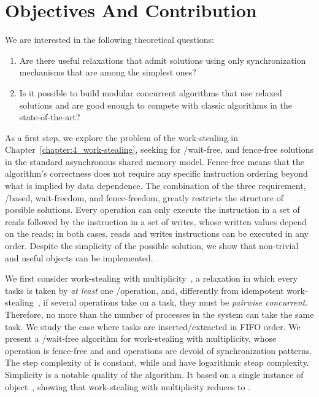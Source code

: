 \section{\label{section:Objectives}Objectives And Contribution}

We are interested in the following theoretical questions:

\begin{enumerate}
  \item Are there useful relaxations that admit solutions using only synchronization mechanisms that are among the simplest ones?
  \item Is it possible to build modular concurrent algorithms that use relaxed solutions and are good enough to compete with classic algorithms in the state-of-the-art?
\end{enumerate}

As a first step, we explore the problem of the work-stealing in Chapter~\ref{chapter:4_work-stealing}, seeking for \R/\W wait-free, and fence-free solutions in the standard asynchronous shared memory model. Fence-free means that the algorithm's correctness does not require any specific instruction ordering beyond what is implied by data dependence. The combination of the three requirement, \R/\W based, wait-freedom, and fence-freedom, greatly restricts the structure of possible solutions. Every operation can only execute the \R instruction in a set of reads followed by the \W instruction in a set of writes, whose written values depend on the reads; in both cases, reads and writes instructions can be executed in any order. Despite the simplicity of the possible solution, we show that non-trivial and useful objects can be implemented.

We first consider work-stealing with multiplicity~\cite{DBLP_journals_dc_CastanedaRR23}, a relaxation in which every tasks is taken by \textit{at least} one \Take/\Steal operation, and, differently from idempotent work-stealing~\cite{maged.vechev.2009}, if several operations take on a task, they must be \textit{pairwise concurrent}. Therefore, no more than the number of processes in the system can take the same task. We study the case where tasks are inserted/extracted in FIFO order. We present a \R/\W wait-free algorithm for work-stealing with multiplicity, whose \Put operation is fence-free and \Take and \Steal operations are devoid of \RAW synchronization patterns. The step complexity  of \Put is constant, while \Take and \Steal have logarithmic steap complexity. Simplicity is a notable quality of the algorithm. It based on a single instance of \MaxReg object~\cite{DBLP_journals_jacm_AspnesAC12,DBLP_journals_siamcomp_JayantiTT00}, showing that work-stealing with multiplicity reduces to \MaxReg.

